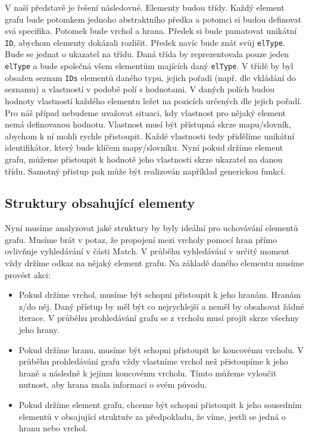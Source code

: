 V naší představě je řešení následovné.
Elementy budou třídy.
Každý element grafu bude potomkem jednoho abstraktního předka a potomci si budou definovat svá specifika.
Potomek bude vrchol a hrana.
Předek si bude pamatovat unikátní \verb+ID+, abychom elementy dokázali rozlišit. 
Předek navíc bude znát svůj \verb+elType+. 
Bude se jednat o ukazatel na třídu.
Daná třída by reprezentovala pouze jeden \verb+elType+ a bude společná všem elementům majících daný \verb+elType+.
V třídě by byl obsažen seznam \verb+IDs+ elementů daného typu, jejich pořadí (např. dle vkládání do seznamu) a vlastností v podobě polí s hodnotami.
V daných polích budou hodnoty vlastností každého elementu ležet na pozicích určených dle jejich pořadí.
Pro náš případ nebudeme uvažovat situaci, kdy vlastnost pro nějaký element nemá definovanou hodnotu.
Vlastnost musí být přístupná skrze mapu/slovník, abychom k ní mohli rychle přistoupit.
Každé vlastnosti tedy přidělíme unikátní identifikátor, který bude klíčem mapy/slovníku.
Nyní pokud držíme element grafu, můžeme přistoupit k hodnotě jeho vlastnosti skrze ukazatel na danou třídu.
Samotný přistup pak může být realizován například generickou funkcí. 

\subsection{Struktury obsahující elementy}

Nyní musíme analyzovat jaké struktury by byly ideální pro uchovávání elementů grafu.
Musíme brát v potaz, že propojení mezi vrcholy pomocí hran přímo ovlivňuje vyhledávání v části Match.
V průběhu vyhledávání v určitý moment vždy držíme odkaz na nějaký element grafu.
Na základě daného elementu musíme provést akci:

\begin{itemize}

\item Pokud držíme vrchol, musíme být schopni přistoupit k jeho hranám.
Hranám z/do něj. Daný přístup by měl být co nejrychlejší a neměl by obsahovat žádné iterace. 
V průběhu prohledávání grafu se z vrcholu musí projít skrze všechny jeho hrany. 

\item Pokud držíme hranu, musíme být schopni přistoupit ke koncovému vrcholu. 
V průběhu prohledávání grafu vždy vlastníme vrchol než přistoupíme k jeho hraně a následně k jejímu koncovému vrcholu. 
Tímto můžeme vyloučit nutnost, aby hrana znala informaci o svém původu.

\item Pokud držíme element grafu, chceme být schopni přistoupit k jeho sousedním elementů v obsajující struktuře za předpokladu, že víme, jestli se jedná o hranu nebo vrchol. 

\end{itemize}

